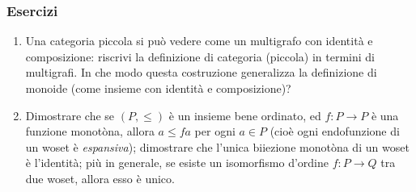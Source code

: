 \subsubsection*{Esercizi}
\begin{enumerate}
	\item Una categoria piccola si può vedere come un multigrafo con identità e composizione: riscrivi la definizione di categoria (piccola) in termini di multigrafi.  In che modo questa costruzione generalizza la definizione di monoide (come insieme con identità e composizione)?
	\item Dimostrare che  se \((P,\le)\) è un insieme bene ordinato, ed \(f : P\to P\) è una funzione monotòna, allora \(a\le fa\) per ogni \(a\in P\) (cioè ogni endofunzione di un woset è \emph{espansiva}); dimostrare che l'unica biiezione monotòna di un woset è l'identità; più in generale, se esiste un isomorfismo d'ordine \(f : P\to Q\) tra due woset, allora esso è unico.
\end{enumerate}

